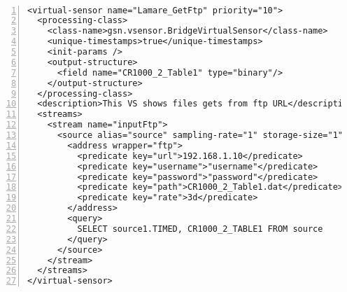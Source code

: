 \paragraph{}
\begin{lstlisting}[numbers=left, breaklines=true]
<virtual-sensor name="Lamare_GetFtp" priority="10">
  <processing-class>
    <class-name>gsn.vsensor.BridgeVirtualSensor</class-name>
    <unique-timestamps>true</unique-timestamps>
    <init-params />
    <output-structure>
      <field name="CR1000_2_Table1" type="binary"/>
    </output-structure>
  </processing-class>
  <description>This VS shows files gets from ftp URL</description>
  <streams>
    <stream name="inputFtp">
      <source alias="source" sampling-rate="1" storage-size="1">
        <address wrapper="ftp">
          <predicate key="url">192.168.1.10</predicate>
          <predicate key="username">"username"</predicate>
          <predicate key="password">"password"</predicate>
          <predicate key="path">CR1000_2_Table1.dat</predicate>
          <predicate key="rate">3d</predicate>
        </address>
        <query>
          SELECT source1.TIMED, CR1000_2_TABLE1 FROM source
        </query>
      </source>
    </stream>
  </streams>
</virtual-sensor>
\end{lstlisting}